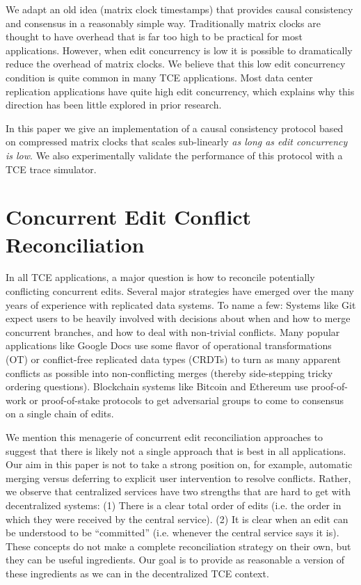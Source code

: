 \documentclass[runningheads]{llncs}
\begin{document}
We adapt an old idea (matrix clock timestamps) that provides causal consistency and consensus in a reasonably simple way.
Traditionally matrix clocks are thought to have overhead that is far too high to be practical for most applications.
However, when edit concurrency is low it is possible to dramatically reduce the overhead of matrix clocks.
We believe that this low edit concurrency condition is quite common in many TCE applications.
Most data center replication applications have quite high edit concurrency, which explains why this direction has been little explored in prior research.

In this paper we give an implementation of a causal consistency protocol based on compressed matrix clocks that scales sub-linearly \emph{as long as edit concurrency is low}.
We also experimentally validate the performance of this protocol with a TCE trace simulator.

\section{Concurrent Edit Conflict Reconciliation}

In all TCE applications, a major question is how to reconcile potentially conflicting concurrent edits.
Several major strategies have emerged over the many years of experience with replicated data systems.
To name a few:
Systems like Git expect users to be heavily involved with decisions about when and how to merge concurrent branches, and how to deal with non-trivial conflicts.
Many popular applications like Google Docs use some flavor of operational transformations (OT) or conflict-free replicated data types (CRDTs) to turn as many apparent conflicts as possible into non-conflicting merges (thereby side-stepping tricky ordering questions).
Blockchain systems like Bitcoin and Ethereum use proof-of-work or proof-of-stake protocols to get adversarial groups to come to consensus on a single chain of edits.

We mention this menagerie of concurrent edit reconciliation approaches to suggest that there is likely not a single approach that is best in all applications.
Our aim in this paper is not to take a strong position on, for example, automatic merging versus deferring to explicit user intervention to resolve conflicts.
Rather, we observe that centralized services have two strengths that are hard to get with decentralized systems:
(1) There is a clear total order of edits (i.e. the order in which they were received by the central service).
(2) It is clear when an edit can be understood to be ``committed'' (i.e. whenever the central service says it is).
These concepts do not make a complete reconciliation strategy on their own, but they can be useful ingredients.
Our goal is to provide as reasonable a version of these ingredients as we can in the decentralized TCE context.
\end{document}
